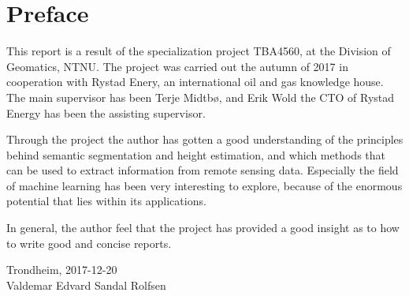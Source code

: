 \section*{Preface}
This report is a result of the specialization project TBA4560, at the Division of Geomatics, NTNU. The project was carried out the autumn of 2017 in cooperation with Rystad Enery, an international oil and gas knowledge house. The main supervisor has been Terje Midtbø, and Erik Wold the CTO of Rystad Energy has been the assisting supervisor.

Through the project the author has gotten a good understanding of the principles behind semantic segmentation and height estimation, and which methods that can be used to extract information from remote sensing data. Especially the field of machine learning has been very interesting to explore, because of the enormous potential that lies within its applications.

In general, the author feel that the project has provided a good insight as to how to write good and concise reports. \\[1pc]

\begin{center}
Trondheim, 2017-12-20\\[4pc]

Valdemar Edvard Sandal Rolfsen
\end{center}